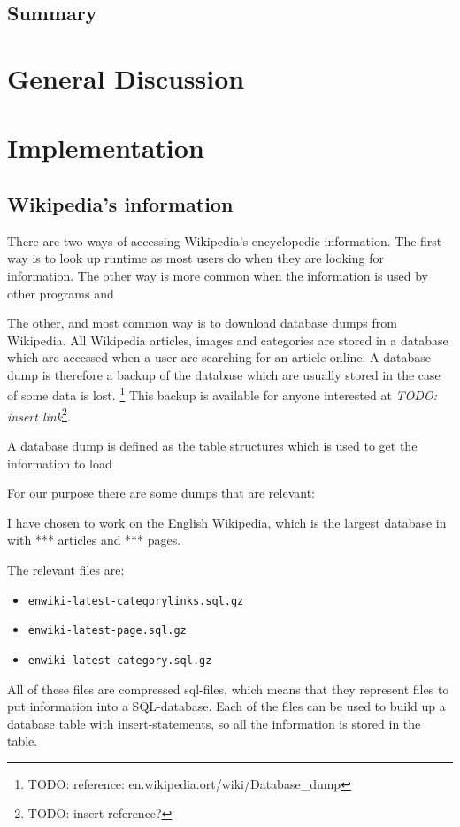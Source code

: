 \documentclass[english,a4paper]{ifimaster}
\newcommand{\enwikicatlink}{\texttt{enwiki-latest-categorylinks.sql.gz} }
\newcommand{\enwikipage}{\texttt{enwiki-latest-page.sql.gz} }
\newcommand{\enwikicategory}{\texttt{enwiki-latest-category.sql.gz} }
\begin{document}
\chapter{Summary}

\part{General Discussion}

\part{Implementation}
\chapter{Wikipedia's information}
There are two ways of accessing Wikipedia's encyclopedic information. The first way is to look up runtime as most users do when they are looking for information. The other way is more common when the information is used by other programs and


The other, and most common way is to download database dumps from Wikipedia. All Wikipedia articles, images and categories are stored in a database which are accessed when a user are searching for an article online. A database dump is therefore a backup of the database which are usually stored in the case of some data is lost. \footnote{TODO: reference: en.wikipedia.ort/wiki/Database\_dump} This backup is available for anyone interested at \emph{TODO: insert link}\footnote{TODO: insert reference?}. 




A database dump is defined as the table structures which is used to get the information to load

For our purpose there are some dumps that are relevant: 


I have chosen to work on the English Wikipedia, which is the largest database in with *** articles and *** pages. 

The relevant files are: 
\begin{itemize}
\item \enwikicatlink
\item \enwikipage
\item \enwikicategory
\end{itemize}

All of these files are compressed sql-files, which means that they represent files to put information into a SQL-database. Each of the files can be used to build up a database table with insert-statements, so all the information is stored in the table. 
\end{document}
